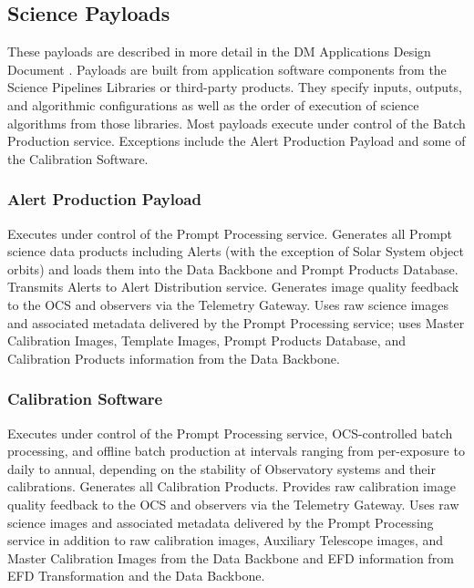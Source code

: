 \documentclass[DM,toc,lsstdraft]{lsstdoc}
\begin{document}
\subsection{Science Payloads}\label{science-payloads}

These payloads are described in more detail in the DM Applications Design Document .
Payloads are built from application software components from the Science Pipelines Libraries or third-party products.
They specify inputs, outputs, and algorithmic configurations as well as the order of execution of science algorithms from those libraries.
Most payloads execute under control of the Batch Production service.
Exceptions include the Alert Production Payload and some of the Calibration Software.

\subsubsection{Alert Production Payload}\label{alert-production-payload}

Executes under control of the Prompt Processing service. Generates all
Prompt science data products including Alerts (with the exception of
Solar System object orbits) and loads them into the Data Backbone and
Prompt Products Database. Transmits Alerts to Alert Distribution service.
Generates image quality feedback to the OCS and observers via the
Telemetry Gateway. Uses raw science images and
associated metadata delivered by the Prompt Processing service; uses
Master Calibration Images, Template Images, Prompt Products Database, and
Calibration Products information from the Data Backbone.

\subsubsection{Calibration Software}\label{calibration-software-payload}

Executes under control of the Prompt Processing service, OCS-controlled batch processing, and offline batch production at intervals ranging from per-exposure to daily to annual, depending on the stability of Observatory systems and their calibrations.
Generates all Calibration Products.
Provides raw calibration image quality feedback to the OCS and observers via the
Telemetry Gateway. Uses raw science images and
associated metadata delivered by the Prompt Processing service in addition to raw calibration images, Auxiliary Telescope images, and Master
Calibration Images from the Data Backbone and EFD information from EFD Transformation and the Data Backbone.
\end{document}
